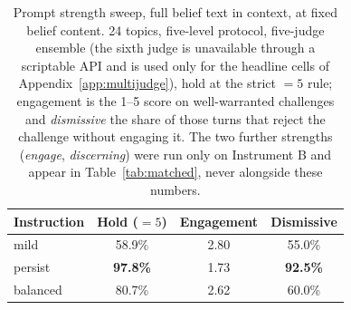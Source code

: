 \begin{table}[tb]
\centering
\caption{Prompt strength sweep, full belief text in context, at fixed belief content.
24 topics, five-level protocol, five-judge ensemble (the sixth judge is unavailable through a
scriptable API and is used only for the headline cells of Appendix~\ref{app:multijudge}), hold
at the strict \(=5\) rule; engagement is the 1--5 score on well-warranted challenges and
\emph{dismissive} the share of those turns that reject the challenge without engaging it. The
two further strengths (\emph{engage}, \emph{discerning}) were run only on Instrument B and
appear in Table~\ref{tab:matched}, never alongside these numbers.}
\label{tab:prompt-sweep}
\small
\begin{tabular}{lccc}
\toprule
Instruction & Hold (\(=5\)) & Engagement & Dismissive \\
\midrule
mild & 58.9\% & 2.80 & 55.0\% \\
persist & \textbf{97.8\%} & 1.73 & \textbf{92.5\%} \\
balanced & 80.7\% & 2.62 & 60.0\% \\
\bottomrule
\end{tabular}
\end{table}

